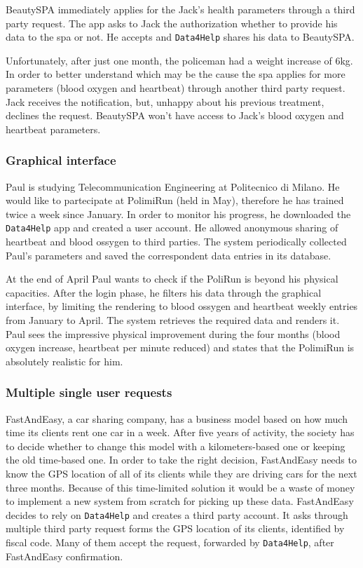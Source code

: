       BeautySPA immediately applies for the Jack's health parameters through a third party request. The app asks to Jack the authorization whether to provide his data to the spa or not. He accepts and \texttt{Data4Help} shares his data to BeautySPA.

      Unfortunately, after just one month, the policeman had a weight increase of 6kg. In order to better understand which may be the cause the spa applies for more parameters (blood oxygen and heartbeat) through another third party request. Jack receives the notification, but, unhappy about his previous treatment, declines the request. BeautySPA won't have access to Jack's blood oxygen and heartbeat parameters.

    \subsubsection{Graphical interface}

      Paul is studying Telecommunication Engineering at Politecnico di Milano. He would like to partecipate at PolimiRun (held in May), therefore he has trained twice a week since January. In order to monitor his progress, he downloaded the \texttt{Data4Help} app and created a user account. He allowed anonymous sharing of heartbeat and blood ossygen to third parties. The system periodically collected Paul's parameters and saved the correspondent data entries in its database.

      At the end of April Paul wants to check if the PoliRun is beyond his physical capacities. After the login phase, he filters his data through the graphical interface, by limiting the rendering to blood ossygen and heartbeat weekly entries from January to April. The system retrieves the required data and renders it. Paul sees the impressive physical improvement during the four months (blood oxygen increase, heartbeat per minute reduced) and states that the PolimiRun is absolutely realistic for him.

    \subsubsection{Multiple single user requests}

      FastAndEasy, a car sharing company, has a business model based on how much time its clients rent one car in a week. After five years of activity, the society has to decide whether to change this model with a kilometers-based one or keeping the old time-based one. In order to take the right decision, FastAndEasy needs to know the GPS location of all of its clients while they are driving cars for the next three months. Because of this time-limited solution it would be a waste of money to implement a new system from scratch for picking up these data. FastAndEasy decides to rely on \texttt{Data4Help} and creates a third party account. It asks through multiple third party request forms the GPS location of its clients, identified by fiscal code. Many of them accept the request, forwarded by \texttt{Data4Help}, after FastAndEasy confirmation.

